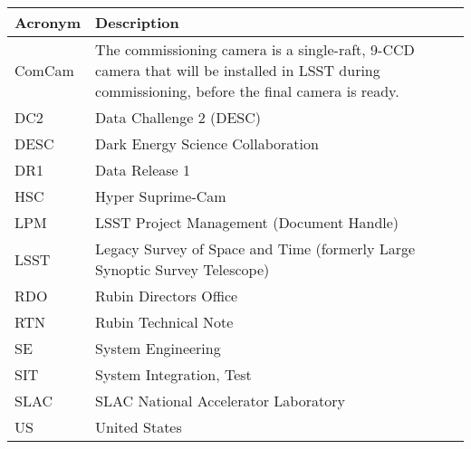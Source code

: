 \addtocounter{table}{-1}
\begin{longtable}{p{}p{}}\hline
\textbf{Acronym} & \textbf{Description}  \\\hline

ComCam & The commissioning camera is a single-raft, 9-CCD camera that will be installed in LSST during commissioning, before the final camera is ready. \\\hline
DC2 & Data Challenge 2 (DESC) \\\hline
DESC & Dark Energy Science Collaboration \\\hline
DR1 & Data Release 1 \\\hline
HSC & Hyper Suprime-Cam \\\hline
LPM & LSST Project Management (Document Handle) \\\hline
LSST & Legacy Survey of Space and Time (formerly Large Synoptic Survey Telescope) \\\hline
RDO & Rubin Directors Office \\\hline
RTN & Rubin Technical Note \\\hline
SE & System Engineering \\\hline
SIT & System Integration, Test \\\hline
SLAC & SLAC National Accelerator Laboratory \\\hline
US & United States \\\hline
\end{longtable}

